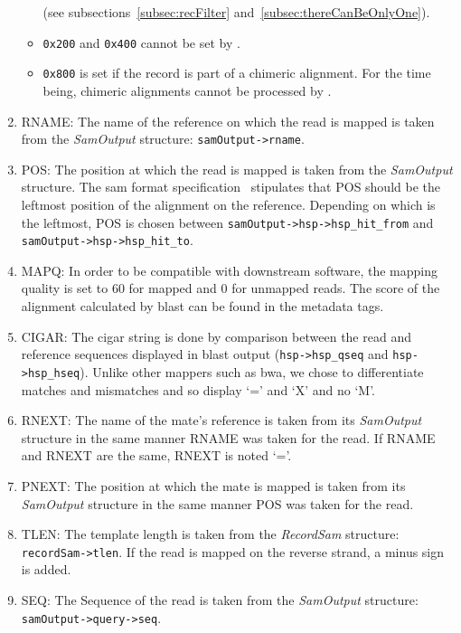 \begin{enumerate}
\begin{itemize}
        (see subsections~\ref{subsec:recFilter} and~\ref{subsec:thereCanBeOnlyOne}).
        \item \texttt{0x200} and \texttt{0x400} cannot be set by \blastobam{}.
        \item \texttt{0x800} is set if the record is part of a chimeric alignment.
        For the time being, chimeric alignments cannot be processed by \blastobam{}.
    \end{itemize}
    \item RNAME\@: The name of the reference on which the read is mapped is taken from the \emph{SamOutput} structure: \texttt{samOutput->\allowbreak{}rname}.
    \item POS\@: The position at which the read is mapped is taken from the \emph{SamOutput} structure.
    The \gls{sam} format specification~\cite{samspec} stipulates that POS should be the leftmost position of the alignment on the reference.
    Depending on which is the leftmost, POS is chosen between \texttt{samOutput->\allowbreak{}hsp->\allowbreak{}hsp\_hit\_from} and \texttt{samOutput->\allowbreak{}hsp->\allowbreak{}hsp\_hit\_to}.
    \item MAPQ\@: In order to be compatible with downstream software, the mapping quality is set to 60 for mapped and 0 for unmapped reads.
    The score of the alignment calculated by \gls{blast} can be found in the metadata tags.
    \item CIGAR\@: The \gls{cigar} string is done by comparison between the read and reference sequences displayed in \gls{blast} output (\texttt{hsp->\allowbreak{}hsp\_qseq} and \texttt{hsp->\allowbreak{}hsp\_hseq}).
    Unlike other mappers such as \gls{bwa}, we chose to differentiate matches and mismatches and so display `=' and `X' and no `M'.
    \item RNEXT\@: The name of the mate's reference is taken from its \emph{SamOutput} structure in the same manner RNAME was taken for the read. If RNAME and RNEXT are the same, RNEXT is noted `='.
    \item PNEXT\@: The position at which the mate is mapped is taken from its \emph{SamOutput} structure in the same manner POS was taken for the read.
    \item TLEN\@: The template length is taken from the \emph{RecordSam} structure: \texttt{recordSam->\allowbreak{}tlen}.
    If the read is mapped on the reverse strand, a minus sign is added.
    \item SEQ\@: The Sequence of the read is taken from the \emph{SamOutput} structure: \texttt{samOutput->\allowbreak{}query->\allowbreak{}seq}.

\end{enumerate}
